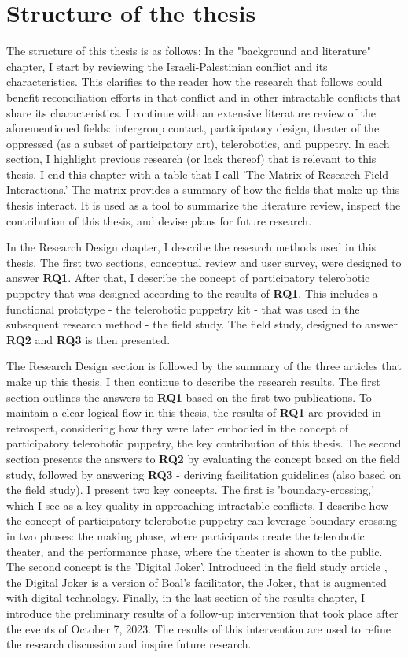 \documentclass[dissertation,math,vertlayout,pdfa,colorlinks,nologo]{aaltoseries}
\begin{document}
\section{Structure of the thesis}
The structure of this thesis is as follows: In the "background and literature" chapter, I start by reviewing the Israeli-Palestinian conflict and its characteristics. This clarifies to the reader how the research that follows could benefit reconciliation efforts in that conflict and in other intractable conflicts that share its characteristics. I continue with an extensive literature review of the aforementioned fields: intergroup contact, participatory design, theater of the oppressed (as a subset of participatory art), telerobotics, and puppetry. In each section, I highlight previous research (or lack thereof) that is relevant to this thesis. I end this chapter with a table that I call 'The Matrix of Research Field Interactions.' The matrix provides a summary of how the fields that make up this thesis interact. It is used as a tool to summarize the literature review, inspect the contribution of this thesis, and devise plans for future research.

In the Research Design chapter, I describe the research methods used in this thesis. The first two sections, conceptual review and user survey, were designed to answer \textbf{RQ1}. After that, I describe the concept of participatory telerobotic puppetry that was designed according to the results of \textbf{RQ1}. This includes a functional prototype - the telerobotic puppetry kit - that was used in the subsequent research method - the field study. The field study, designed to answer \textbf{RQ2} and \textbf{RQ3} is then presented.

The Research Design section is followed by the summary of the three articles that make up this thesis. I then continue to describe the research results. The first section outlines the answers to \textbf{RQ1} based on the first two publications. To maintain a clear logical flow in this thesis, the results of \textbf{RQ1} are provided in retrospect, considering how they were later embodied in the concept of participatory telerobotic puppetry, the key contribution of this thesis. The second section presents the answers to \textbf{RQ2} by evaluating the concept based on the field study, followed by answering \textbf{RQ3} - deriving facilitation guidelines (also based on the field study). I present two key concepts. The first is 'boundary-crossing,' which I see as a key quality in approaching intractable conflicts. I describe how the concept of participatory telerobotic puppetry can leverage boundary-crossing in two phases: the making phase, where participants create the telerobotic theater, and the performance phase, where the theater is shown to the public. The second concept is the 'Digital Joker'. Introduced in the field study article \cite{peledTeleroboticTheaterOppressed2025}, the Digital Joker is a version of Boal's facilitator, the Joker, that is augmented with digital technology. Finally, in the last section of the results chapter, I introduce the preliminary results of a follow-up intervention that took place after the events of October 7, 2023. The results of this intervention are used to refine the research discussion and inspire future research.
\end{document}
